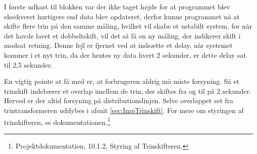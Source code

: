 I første udkast til blokken var der ikke taget højde for at programmet blev eksekveret hurtigere end data blev opdateret, derfor kunne programmet nå at skifte flere trin på den samme måling, hvilket vil skabe et ustabilt system, for når det havde lavet et dobbeltskift, vil det så få en ny måling, der indikerer skift i modsat retning. Denne fejl er fjernet ved at indsætte et delay, når systemet kommer i et nyt trin, da der hentes ny data hvert 2 sekunder, er dette delay sat til 2,5 sekunder.


En vigtig pointe at få med er, at forbrugeren aldrig må miste forsyning. Så et trinskift indebærer et overlap imellem de trin, der skiftes fra og til på 2 sekunder. Herved er der altid forsyning på distributionslinjen. Selve overlappet set fra trintransformeren uddybes i afsnit \ref{sec:ImpTrinskift}.
For mere om styringen af trinskifteren, se dokumentationen.\footnote{Projektdokumentation, 10.1.2, Styring af Trinskifteren.}
